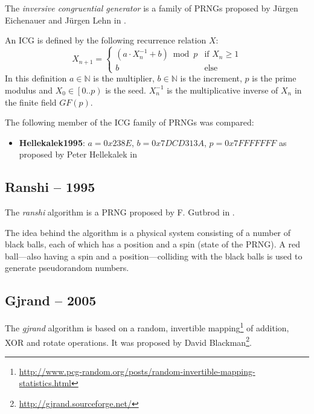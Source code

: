     The \emph{inversive congruential generator} is a family of PRNGs proposed by Jürgen Eichenauer and Jürgen Lehn in \cite{Eichenauer:1986}.

    An ICG is defined by the following recurrence relation $X$:
    \begin{equation*}
        X_{n + 1} = \begin{cases}
                        \left(a \cdot X_n^{-1} + b\right) \bmod p & \text{if } X_n \geq 1 \\
                        b                                         & \text{else}
                    \end{cases}
    \end{equation*}
    In this definition $a \in \mathbb{N}$ is the multiplier, $b \in \mathbb{N}$ is the increment, $p$ is the prime modulus and $X_0 \in \left[0.. p\right)$ is the seed. $X_n^{-1}$ is the multiplicative inverse of $X_n$ in the finite field $GF\left(p\right)$.

    The following member of the ICG family of PRNGs was compared:
    \begin{itemize}
        \itemsep0em
        \item \textbf{Hellekalek1995}: $a = 0x238E$, $b = 0x7DCD313A$, $p = 0x7FFFFFFF$ as proposed by Peter Hellekalek in \cite{Hellekalek:1995}
    \end{itemize}

\subsection[Ranshi -- 1995]{Ranshi -- 1995} \label{subsec:ranshi}

    The \emph{ranshi} algorithm is a PRNG proposed by F. Gutbrod in \cite{Gutbrod:1995}.

    The idea behind the algorithm is a physical system consisting of a number of black balls, each of which has a position and a spin (state of the PRNG). A red ball---also having a spin and a position---colliding with the black balls is used to generate pseudorandom numbers.

\subsection[Gjrand -- 2005]{Gjrand -- 2005} \label{subsec:gjrand}

    The \emph{gjrand} algorithm is based on a random, invertible mapping\footnote{\url{http://www.pcg-random.org/posts/random-invertible-mapping-statistics.html}} of addition, XOR and rotate operations. It was proposed by David Blackman\footnote{\url{http://gjrand.sourceforge.net/}}.

